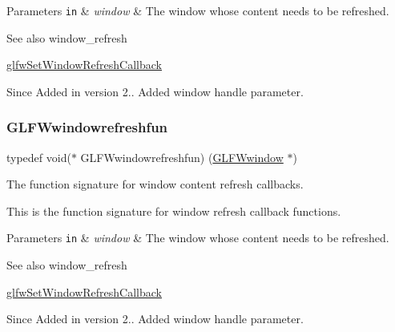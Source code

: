\begin{DoxyParams}[1]{Parameters}
\mbox{\tt in}  & {\em window} & The window whose content needs to be refreshed.\\
\hline
\end{DoxyParams}
\begin{DoxySeeAlso}{See also}
window\+\_\+refresh 

\hyperlink{group__window_ga9d2621fbc271a0cdc0ce91f9749f46e3}{glfw\+Set\+Window\+Refresh\+Callback}
\end{DoxySeeAlso}
\begin{DoxySince}{Since}
Added in version 2..  Added window handle parameter. 
\end{DoxySince}
\mbox{\label{group__window_ga7a56f9e0227e2cd9470d80d919032e08}} 
\subsubsection{\texorpdfstring{G\+L\+F\+Wwindowrefreshfun}{GLFWwindowrefreshfun}\hspace{0.1cm}{\footnotesize\ttfamily [4/5]}}
{\footnotesize\ttfamily typedef void($\ast$  G\+L\+F\+Wwindowrefreshfun) (\hyperlink{group__window_ga3c96d80d363e67d13a41b5d1821f3242}{G\+L\+F\+Wwindow} $\ast$)}



The function signature for window content refresh callbacks. 

This is the function signature for window refresh callback functions.


\begin{DoxyParams}[1]{Parameters}
\mbox{\tt in}  & {\em window} & The window whose content needs to be refreshed.\\
\hline
\end{DoxyParams}
\begin{DoxySeeAlso}{See also}
window\+\_\+refresh 

\hyperlink{group__window_ga9d2621fbc271a0cdc0ce91f9749f46e3}{glfw\+Set\+Window\+Refresh\+Callback}
\end{DoxySeeAlso}
\begin{DoxySince}{Since}
Added in version 2..  Added window handle parameter. 
\end{DoxySince}
\mbox{\label{group__window_ga7a56f9e0227e2cd9470d80d919032e08}} 
